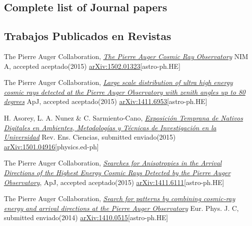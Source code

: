 \ifeng
\subsection*{Complete list of Journal papers}
\else
\subsection*{Trabajos Publicados en Revistas}
\fi
\noindent
\begin{etaremune}

\item {}The Pierre Auger Collaboration, \href{http://dx.doi.org/}{\emph{The Pierre Auger Cosmic Ray Observatory}} NIM A, \ifeng accepted \else aceptado\fi (2015) \href{http://arxiv.org/abs/1502.01323}{arXiv:1502.01323}[astro-ph.HE]

\item {}The Pierre Auger Collaboration, \href{http://dx.doi.org/}{\emph{Large scale distribution of ultra high energy cosmic rays detected at the Pierre Auger Observatory with zenith angles up to 80 degrees}} ApJ, \ifeng accepted \else aceptado\fi (2015) \href{http://arxiv.org/abs/1411.6953}{arXiv:1411.6953}[astro-ph.HE]

\item {} H. Asorey, L. A. Nunez \& C. Sarmiento-Cano, \href{http://dx.doi.org/}{\emph{Exposición Temprana de Nativos Digitales en Ambientes, Metodologías y Técnicas de Investigación en la Universidad}} Rev. Ens. Ciencias, \ifeng submitted \else enviado\fi (2015) \href{http://arxiv.org/abs/1501.04916}{arXiv:1501.04916}[physics.ed-ph]

\item {}The Pierre Auger Collaboration, \href{http://dx.doi.org/}{\emph{Searches for Anisotropies in the Arrival Directions of the Highest Energy Cosmic Rays Detected by the Pierre Auger Observatory}}, ApJ, \ifeng accepted \else aceptado\fi (2015) \href{http://arxiv.org/abs/1411.6111}{arXiv:1411.6111}[astro-ph.HE]

\item {}The Pierre Auger Collaboration, \href{http://dx.doi.org/}{\emph{Search for patterns by combining cosmic-ray energy and arrival directions at the Pierre Auger Observatory}} Eur. Phys. J. C, \ifeng submitted \else enviado\fi (2014) \href{http://arxiv.org/abs/1410.0515}{arXiv:1410.0515}[astro-ph.HE]



\end{etaremune}
